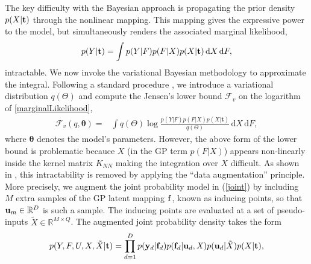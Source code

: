 \documentclass{article} %
\begin{document}
The key difficulty with the Bayesian approach is propagating the prior
density $p(X|\mathbf{t})$ through the nonlinear mapping. This
mapping gives the expressive power to the model, but simultaneously
renders the associated marginal
likelihood,
\begin{equation}
\label{marginalLikelihood}
p(Y | \mathbf{t}) =  \int p( Y | F) p(F | X ) p(X | \mathbf{t}) \, \mathrm{d} X \,\mathrm{d}F,
\end{equation}
intractable. We now invoke the variational Bayesian methodology to
approximate the integral. Following a standard procedure
\cite{bishop}, we introduce a variational distribution $q(\Theta)$ and
compute the Jensen's lower bound $\mathcal{F}_v$ on the logarithm of
\eqref{marginalLikelihood},
%
\begin{align}
\mathcal{F}_v(q, \boldsymbol \theta) = {}& \int q(\mathit{\Theta}) \log 
		\frac{ p(Y | F) p(F | X ) p(\mathit{X} | \mathbf{t})}
			 {q(\mathit{\Theta})}  \, \mathrm{d} X \,\mathrm{d}F,
		 \label{jensens1}
\end{align}
%
%
where $\boldsymbol \theta$ denotes the model's parameters.  However,
the above form of the lower bound is problematic becauce $X$ (in the
GP term $p(F|X)$) appears non-linearly inside the kernel matrix
$K_{NN}$ making the integration over $X$ difficult. As shown in
\cite{BayesianGPLVM}, this intractability is removed by applying the
``data augmentation'' principle.  More precisely, we augment the joint
probability model in (\ref{joint}) by including $M$ extra samples of
the GP latent mapping $\mathbf{f}$, known as inducing points, so that
$\mathbf{u}_m \in \mathbb{R}^D$ is such a sample. The inducing points are
evaluated at a set of pseudo-inputs $\tilde{X} \in \mathbb{R}^{M
  \times Q}$. %
The augmented joint probability density takes the form
\begin{equation}
 \label{augmentedJoint}
p(Y,F, U,X,\tilde{X} | \mathbf{t}) = \prod_{d=1}^D p(\mathbf{y}_d | \mathbf{f}_d) p(\mathbf{f}_d | \mathbf{u}_d, \mathit{X})
p(\mathbf{u}_d | \tilde{X})  p(X | \mathbf{t}),
\end{equation}
\end{document}
